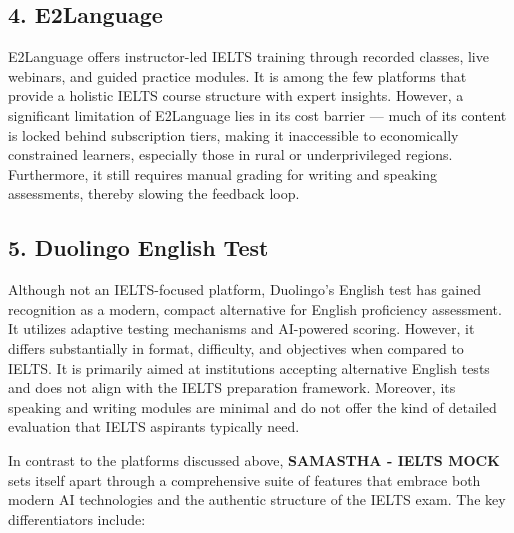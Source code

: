 \documentclass[a4paper,12pt]{article}
\begin{document}
\vspace{0.3cm}

\subsection*{4. E2Language}
E2Language offers instructor-led IELTS training through recorded classes, live webinars, and guided practice modules. It is among the few platforms that provide a holistic IELTS course structure with expert insights. However, a significant limitation of E2Language lies in its cost barrier — much of its content is locked behind subscription tiers, making it inaccessible to economically constrained learners, especially those in rural or underprivileged regions. Furthermore, it still requires manual grading for writing and speaking assessments, thereby slowing the feedback loop.

\vspace{0.3cm}

\subsection*{5. Duolingo English Test}
Although not an IELTS-focused platform, Duolingo’s English test has gained recognition as a modern, compact alternative for English proficiency assessment. It utilizes adaptive testing mechanisms and AI-powered scoring. However, it differs substantially in format, difficulty, and objectives when compared to IELTS. It is primarily aimed at institutions accepting alternative English tests and does not align with the IELTS preparation framework. Moreover, its speaking and writing modules are minimal and do not offer the kind of detailed evaluation that IELTS aspirants typically need.

\vspace{0.5cm}

\noindent
In contrast to the platforms discussed above, \textbf{SAMASTHA - IELTS MOCK} sets itself apart through a comprehensive suite of features that embrace both modern AI technologies and the authentic structure of the IELTS exam. The key differentiators include:
\end{document}
